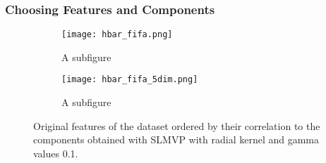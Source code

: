 

\subsubsection{Choosing Features and Components}

\begin{figure}[!ht]
    \centering
    \begin{subfigure}{.5\textwidth}
        \centering
        \texttt{[image: hbar\_fifa.png]}
        \caption{A subfigure}
    \end{subfigure}%
    \begin{subfigure}{.5\textwidth}
        \centering
        \texttt{[image: hbar\_fifa\_5dim.png]}
        \caption{A subfigure}
    \end{subfigure}
    \caption{Original features of the dataset ordered by their correlation to the components obtained with SLMVP with radial kernel and gamma values 0.1.}
    \label{fig:test}
\end{figure}



